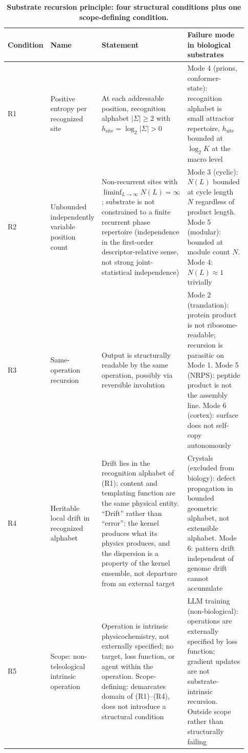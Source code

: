 \documentclass[aps,prx,reprint,amsmath,amssymb,floatfix,superscriptaddress,nofootinbib]{revtex4-2}
\theoremstyle{plain-thm}
\theoremstyle{definition-thm}
\begin{document}
\begin{table}
\caption{\textbf{Substrate recursion principle: four structural conditions plus one scope-defining condition.}}
\label{tab:principle}
\begin{tabular}{p{0.05\linewidth} p{0.18\linewidth} p{0.30\linewidth} p{0.40\linewidth}}
\toprule
Condition & Name & Statement & Failure mode in biological substrates \\
\midrule
R1 & Positive entropy per recognized site & At each addressable position, recognition alphabet $|\Sigma| \ge 2$ with $h_{\mathrm{site}} = \log_2 |\Sigma| > 0$ & Mode 4 (prions, conformer-state): recognition alphabet is small attractor repertoire, $h_{\mathrm{site}}$ bounded at $\log_2 K$ at the macro level \\
R2 & Unbounded independently variable position count & Non-recurrent sites with $\liminf_{L\to\infty} N(L) = \infty$; substrate is not constrained to a finite recurrent phase repertoire (independence in the first-order descriptor-relative sense, not strong joint-statistical independence) & Mode 3 (cyclic): $N(L)$ bounded at cycle length $N$ regardless of product length. Mode 5 (modular): bounded at module count $N$. Mode 4: $N(L) \approx 1$ trivially \\
R3 & Same-operation recursion & Output is structurally readable by the same operation, possibly via reversible involution & Mode 2 (translation): protein product is not ribosome-readable; recursion is parasitic on Mode 1. Mode 5 (NRPS): peptide product is not the assembly line. Mode 6 (cortex): surface does not self-copy autonomously \\
R4 & Heritable local drift in recognized alphabet & Drift lies in the recognition alphabet of (R1); content and templating function are the same physical entity. ``Drift'' rather than ``error'': the kernel produces what its physics produces, and the dispersion is a property of the kernel ensemble, not departure from an external target & Crystals (excluded from biology): defect propagation in bounded geometric alphabet, not extensible alphabet. Mode 6: pattern drift independent of genome drift cannot accumulate \\
R5 & Scope: non-teleological intrinsic operation & Operation is intrinsic physicochemistry, not externally specified; no target, loss function, or agent within the operation. Scope-defining: demarcates domain of (R1)--(R4), does not introduce a structural condition & LLM training (non-biological): operations are externally specified by loss function; gradient updates are not substrate-intrinsic recursion. Outside scope rather than structurally failing \\
\bottomrule
\end{tabular}
\end{table}
\end{document}
